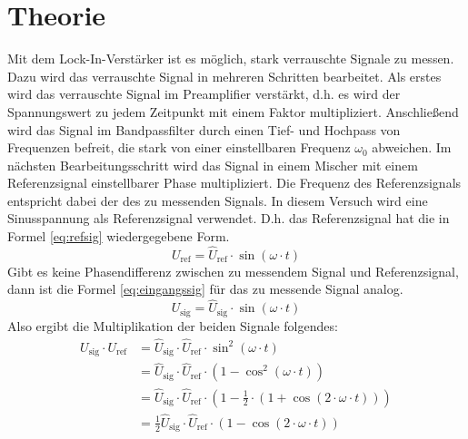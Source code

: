 
\section{Theorie}
Mit dem Lock-In-Verstärker ist es möglich, stark verrauschte Signale zu
messen.  Dazu wird das verrauschte Signal in mehreren Schritten bearbeitet. Als erstes wird das verrauschte Signal im Preamplifier
verstärkt, d.h. es wird der Spannungswert zu jedem Zeitpunkt mit einem Faktor multipliziert. Anschließend wird das Signal im Bandpassfilter durch einen
Tief- und Hochpass von Frequenzen befreit, die stark von einer
einstellbaren Frequenz $\omega_0$ abweichen.  Im nächsten
Bearbeitungsschritt wird das Signal in einem Mischer mit einem
Referenzsignal einstellbarer Phase multipliziert. Die Frequenz des
Referenzsignals entspricht dabei der des zu messenden Signals.  In
diesem Versuch wird eine Sinusspannung als Referenzsignal
verwendet. D.h. das Referenzsignal hat die in Formel \eqref{eq:refsig}
wiedergegebene Form.
%
\begin{equation}
  \label{eq:refsig}
  U_\text{ref} = \widehat{U}_\text{ref} \cdot \sin(\omega \cdot t)
\end{equation}
%
Gibt es keine Phasendifferenz zwischen zu messendem Signal und
Referenzsignal, dann ist die Formel \eqref{eq:eingangssig} für das zu
messende Signal analog.
%
\begin{equation}
  \label{eq:eingangssig}
  U_\text{sig} = \widehat{U}_\text{sig} \cdot \sin(\omega \cdot t)
\end{equation}
%
Also ergibt die Multiplikation der beiden Signale folgendes:
%
\begin{equation*}
  \begin{split}
    U_\text{sig} \cdot U_\text{ref}
    &= \widehat{U}_\text{sig}\cdot \widehat{U}_\text{ref}\cdot
    \sin^2(\omega \cdot t) \\
    &= \widehat{U}_\text{sig} \cdot \widehat{U}_\text{ref}
    \cdot (1 - \cos^2(\omega \cdot t)) \\
    &= \widehat{U}_\text{sig} \cdot \widehat{U}_\text{ref} \cdot (1 -
    \frac{1}{2} \cdot (1 +
    \cos(2\cdot \omega \cdot t)))\\
    &= \frac{1}{2} \widehat{U}_\text{sig} \cdot \widehat{U}_\text{ref}
    \cdot(1 - \cos(2\cdot \omega\cdot t))
  \end{split}
\end{equation*}
